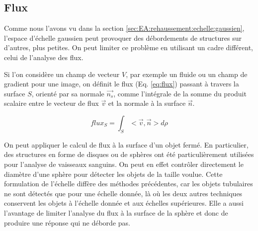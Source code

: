   \subsection{Flux}
  \label{sec:EA:rehaussement:echelle:flux}
  
  Comme nous l'avons vu dans la section \ref{sec:EA:rehaussement:echelle:gaussien}, l'espace d'échelle gaussien peut provoquer des débordements de structures sur d'autres, plus petites. On peut limiter ce problème en utilisant un cadre différent, celui de l'analyse des flux.
  
  Si l'on considère un champ de vecteur $V$, par exemple un fluide ou un champ de gradient pour une image, on définit le flux (Eq. \ref{eq:flux}) passant à travers la surface $S$, orienté par sa normale $\vec{n_s}$, comme l'intégrale de la somme du produit scalaire entre le vecteur de flux $\vec{v}$ et la normale à la surface $\vec{n}$.
  
  \begin{equation}
  flux_S = \int_{S}< \vec{v},\vec{n} > d\rho
  \label{eq:flux}
  \end{equation}
  
  On peut appliquer le calcul de flux à la surface d'un objet fermé. En particulier, des structures en forme de disques ou de sphères ont été particulièrement utilisées pour l'analyse de vaisseaux sanguins. On peut en effet contrôler directement le diamètre d'une sphère pour détecter les objets de la taille voulue. Cette formulation de l'échelle diffère des méthodes précédentes, car les objets tubulaires ne sont détectés que pour une échelle donnée, là où les deux autres techniques conservent les objets à l'échelle donnée et aux échelles supérieures. Elle a aussi l'avantage de limiter l'analyse du flux à la surface de la sphère et donc de produire une réponse qui ne déborde pas.
  
